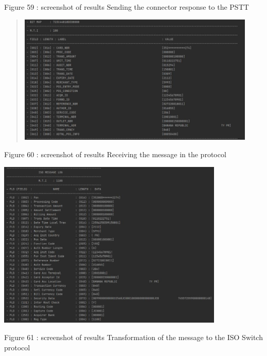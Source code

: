 \documentclass[12pt,a4paper]{report}
\begin{document}
\protect\hypertarget{_Toc201954535}{}{}Figure 59 : screenshot of results
Sending the connector response to the PSTT

\begin{quote}
\includegraphics[width=4.46344in,height=2.44683in]{vertopal_d1b0b2209edd4c6aa8254f57daa0953b/media/image79.jpeg}
\end{quote}

\protect\hypertarget{_Toc201954536}{}{}Figure 60 : screenshot of results
Receiving the message in the protocol

\includegraphics[width=4.25206in,height=3.16478in]{vertopal_d1b0b2209edd4c6aa8254f57daa0953b/media/image80.jpeg}

\protect\hypertarget{_Toc201954537}{}{}Figure 61 : screenshot of results
Transformation of the message to the ISO Switch protocol
\end{document}
